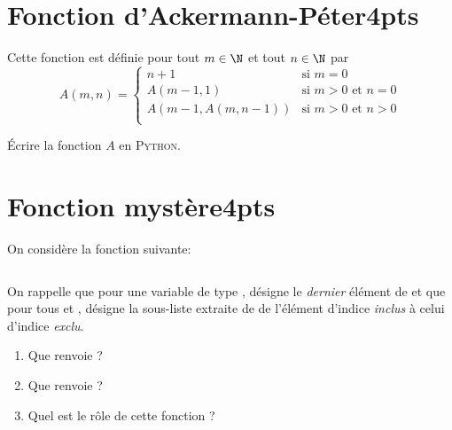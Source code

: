 \documentclass[a4paper,12pt,eval,firamath]{nsi}
\begin{document}
\maketitle
\section{Fonction d'Ackermann-Péter\hfill\tiny 4pts}
Cette fonction est définie pour tout $m\in\N$ et tout $n\in\N$ par
$$A(m,n)=\begin{cases}
        n+1             & \mbox{si } m=0                \\
        A(m-1,1)        & \mbox{si } m>0\mbox{ et } n=0 \\
        A(m-1,A(m,n-1)) & \mbox{si } m>0\mbox{ et } n>0 \\
    \end{cases}$$

\'Ecrire la fonction $A$ en \textsc{Python}.\\


\section{Fonction mystère\hfill\tiny 4pts}

On considère la fonction suivante:
\begin{pyc}
    \inputminted{python}{scripts/mystery.py}
\end{pyc}


On rappelle que pour une variable  de type ,  désigne le \textit{dernier} élément de  et que pour tous  et ,  désigne la sous-liste extraite de  de
l'élément d'indice  \textit{inclus} à celui d'indice  \textit{exclu}.

\begin{enumerate}
    \item 	Que renvoie  ?\\
          
    \item 	Que renvoie  ?\\
          
    \item   Quel est le rôle de cette fonction ?\\
          
\end{enumerate}
\end{document}
